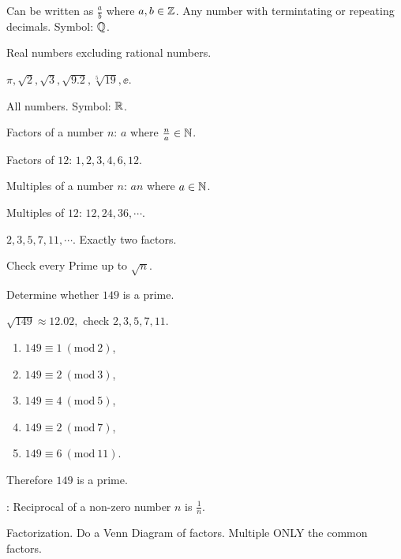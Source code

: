 \documentclass[8pt]{article}
\begin{document}
		\defi {} Can be written as \(\frac{a}{b}\) where \(a, b \in \mathbb{Z}\). Any number with termintating or repeating decimals. Symbol: \(\mathbb{Q}\).

		\defi {} Real numbers excluding rational numbers.
		
		\exmp {} \(\pi, \sqrt{2}, \sqrt{3}, \sqrt{9.2}, \sqrt[5]{19}, \ee\).

		\defi {} All numbers. Symbol: \(\mathbb{R}\).

		\defi {} Factors of a number \(n\): \(a\) where \(\frac{n}{a} \in \mathbb{N}\).
		
		\exmp {} Factors of \(12\): \(1, 2, 3, 4, 6, 12\).

		\defi {} Multiples of a number \(n\): \(an\) where \(a \in \mathbb{N}\).
		
		\exmp {} Multiples of \(12\): \(12, 24, 36, \cdots\).

		\defi {} \(2, 3, 5, 7, 11, \cdots\). Exactly two factors.

		\meth {} Check every Prime up to \(\sqrt{n}\).\newline

		\prob Determine whether \(149\) is a prime.
		
		\solution \(\sqrt{149} \approx 12.02,\) check \(2, 3, 5, 7, 11\).
		
		\begin{enumerate}[label=\methword{(\arabic*)}]
			\item \(149 \equiv 1\ (\mathrm{mod}\ 2)\),
			\item \(149 \equiv 2\ (\mathrm{mod}\ 3)\),
			\item \(149 \equiv 4\ (\mathrm{mod}\ 5)\),
			\item \(149 \equiv 2\ (\mathrm{mod}\ 7)\),
			\item \(149 \equiv 6\ (\mathrm{mod}\ 11)\). 
		\end{enumerate}

		Therefore \(149\) is a prime.\newline

		\defi {}: Reciprocal of a non-zero number \(n\) is \(\frac{1}{n}\).

		\meth {} Factorization. Do a Venn Diagram of factors. Multiple ONLY the common factors.\newline
		
\end{document}
